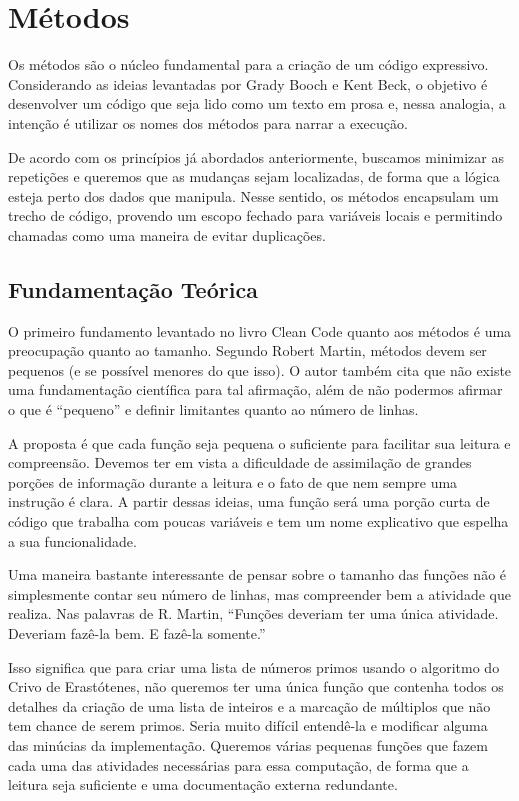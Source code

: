 \section{Métodos}
\label{sec:metodos}

Os métodos são o núcleo fundamental para a criação de um código expressivo. Considerando as ideias levantadas por Grady Booch e Kent Beck, o objetivo é desenvolver um código que seja lido como um texto em prosa e, nessa analogia, a intenção é utilizar os nomes dos métodos para narrar a execução.
	
De acordo com os princípios já abordados anteriormente, buscamos minimizar as repetições e queremos que as mudanças sejam localizadas, de forma que a lógica esteja perto dos dados que manipula. Nesse sentido, os métodos encapsulam um trecho de código, provendo um escopo fechado para variáveis locais e permitindo chamadas como uma maneira de evitar duplicações.

\subsection{Fundamentação Teórica}
O primeiro fundamento levantado no livro Clean Code quanto aos métodos é uma preocupação quanto ao tamanho. Segundo Robert Martin, métodos devem ser pequenos (e se possível menores do que isso). O autor também cita que não existe uma fundamentação científica para tal afirmação, além de não podermos afirmar o que é “pequeno” e definir limitantes quanto ao número de linhas.
	
A proposta é que cada função seja pequena o suficiente para facilitar sua leitura e compreensão. Devemos ter em vista a dificuldade de assimilação de grandes porções de informação durante a leitura e o fato de que nem sempre uma instrução é clara. A partir dessas ideias, uma função será uma porção curta de código que trabalha com poucas variáveis e tem um nome explicativo que espelha a sua funcionalidade.
	
Uma maneira bastante interessante de pensar sobre o tamanho das funções não é simplesmente contar seu número de linhas, mas compreender bem a atividade que realiza. Nas palavras de R. Martin, “Funções deveriam ter uma única atividade. Deveriam fazê-la bem. E fazê-la somente.”
	
Isso significa que para criar uma lista de números primos usando o algoritmo do Crivo de Erastótenes, não queremos ter uma única função que contenha todos os detalhes da criação de uma lista de inteiros e a marcação de múltiplos que não tem chance de serem primos. Seria muito difícil entendê-la e modificar alguma das minúcias da implementação. Queremos várias pequenas funções que fazem cada uma das atividades necessárias para essa computação, de forma que a leitura seja suficiente e uma documentação externa redundante.
	
